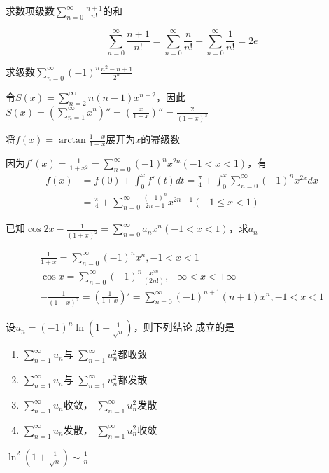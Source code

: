 \documentclass{article}
\begin{document}
\begin{examplle}[]
求数项级数\(\displaystyle\sum_{n=0}^\infty\frac{n+1}{n!}\)的和

\begin{equation*}
\sum_{n=0}^\infty\frac{n+1}{n!}=
\sum_{n=0}^\infty\frac{n}{n!}+\sum_{n=0}^\infty\frac{1}{n!}=2e
\end{equation*}
\end{examplle}

\begin{examplle}[]
求级数\(\displaystyle \sum_{n=0}^\infty(-1)^n\frac{n^2-n+1}{2^n}\)

令\(S(x)=\displaystyle \sum_{n=2}^\infty n(n-1)x^{n-2}\)，因此
\(S(x)=\left(\sum_{n=1}^\infty x^n\right)''=\left(\frac{x}{1-x}\right)''=\frac{2}{(1-x)^3}\)
\end{examplle}

\begin{examplle}[]
将\(f(x)=\arctan\displaystyle\frac{1+x}{1-x}\)展开为\(x\)的幂级数

因为\(f'(x)=\displaystyle\frac{1}{1+x^2}=\displaystyle
   \sum_{n=0}^\infty(-1)^nx^{2n}(-1<x<1)\)，有
\begin{align*}
f(x)&=f(0)+\int_0^xf'(t)dt=\frac{\pi}{4}+\int_0^x \sum_{n=0}^\infty(-1)^nx^{2x}dx\\
&=\frac{\pi}{4}+ \sum_{n=0}^\infty\frac{(-1)^n}{2n+1}x^{2n+1}(-1\le x<1)
\end{align*}
\end{examplle}

\begin{examplle}[]
已知\(\displaystyle\cos2x-\frac{1}{(1+x)^2}=\displaystyle \sum_{n=0}^\infty
   a_nx^n(-1<x<1)\)，求\(a_n\)

\begin{gather*}
\frac{1}{1+x}=\sum_{n=0}^\infty(-1)^nx^n,-1<x<1\\
\cos x=\sum_{n=0}^\infty(-1)^n\frac{x^{2n}}{(2n!)},-\infty<x<+\infty\\
-\frac{1}{(1+x)^2}=\left(\frac{1}{1+x}\right)'=\sum_{n=0}^\infty(-1)^{n+1}(n+1)x^n,-1<x<1
\end{gather*}
\end{examplle}

\begin{examplle}[]
设\(u_n=\displaystyle(-1)^n\ln\left(1+\frac{1}{\sqrt{n}}\right)\)，则下列结论
成立的是
\begin{enumerate}
\item \(\displaystyle \sum_{n=1}^\infty u_n\)与
\(\displaystyle \sum_{n=1}^\infty u_n^2\)都收敛
\item \(\displaystyle \sum_{n=1}^\infty u_n\)与
\(\displaystyle \sum_{n=1}^\infty u_n^2\)都发散
\item \(\displaystyle \sum_{n=1}^\infty u_n\)收敛，
\(\displaystyle \sum_{n=1}^\infty u_n^2\)发散
\item \(\displaystyle \sum_{n=1}^\infty u_n\)发散，
\(\displaystyle \sum_{n=1}^\infty u_n^2\)收敛
\end{enumerate}


\(\ln^2(1+\frac{1}{\sqrt{n}})\sim\frac{1}{n}\)
\end{examplle}
\end{document}
